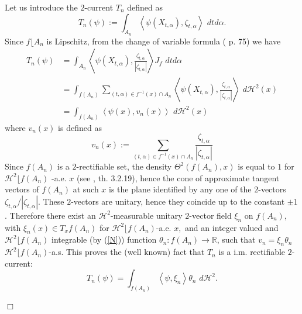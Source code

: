 \documentclass{article}
\newenvironment{proof}[1][Proof]{{\sc #1.} }{\hfill $\Box$}
\begin{document}
\begin{proof}

Let us introduce the $2$-current $T_{n}$ defined as
\begin{equation*}
T_{n}\left( \psi \right) :=\int_{A_{n}}\left\langle \psi \left( X_{t,\alpha
}\right) ,\zeta_{t,\alpha}\right\rangle \,\,dtd\alpha .
\end{equation*}
Since $f\lfloor A_{n}$ is Lipschitz, from the change of variable formula ( 
\cite{GMS} p. 75) we have 
\begin{equation*}
  \begin{split}
T_{n}\left( \psi \right) & =\int_{A_{n}}\left\langle \psi \left( X_{t,\alpha
}\right) ,\frac{\zeta_{t,\alpha}}{|\zeta_{t,\alpha}|}%
\right\rangle J_{f}\,\,dtd\alpha 
\\ &= \int_{f\left( A_{n}\right) }\sum_{\left( t,\alpha \right) \in
f^{-1}\left( x\right) \cap A_{n}}\left\langle \psi \left( X_{t,\alpha
}\right) ,\frac{\zeta_{t,\alpha}}{|\zeta_{t,\alpha}|}
\right\rangle \,\,d\mathcal{H}^{2}\left( x\right)  
\\&=\int_{f\left( A_{n}\right) }\left\langle \psi \left( x\right)
,v_{n}\left( x\right) \right\rangle \,\,d\mathcal{H}^{2}\left( x\right) 
  \end{split}
\end{equation*}
where $v_{n}\left( x\right) $ is defined as
\begin{equation*}
v_{n}\left( x\right) :=\sum_{\left( t,\alpha \right) \in f^{-1}\left(
x\right) \cap A_{n}}\frac{\zeta_{t,\alpha}}{|\zeta_{t,\alpha}|}
\end{equation*}
Since $f(A_{n})$ is a $2$-rectifiable set, the density $\Theta ^{2}\left(
f(A_{n}),x\right) $ is equal to $1$ for $\mathcal{H}^{2}\lfloor f(A_{n})$%
-a.e. $x$ (see \cite{Fed}, th. 3.2.19), hence the cone of approximate
tangent vectors of $f(A_{n})$ at such $x$ is the plane identified by any one
of the $2$-vectors $\zeta_{t,\alpha}/|\zeta_{t,\alpha}|$. These $2$-vectors are unitary, hence they
coincide up to the constant $\pm 1$. Therefore there exist an $\mathcal{H}%
^{2}$-measurable unitary $2$-vector field $\xi _{n}$ on $f(A_{n})$, with $%
\xi _{n}\left( x\right) \in T_{x}f(A_{n})$ for $\mathcal{H}^{2}\lfloor
f(A_{n})$-a.e. $x,$ and an integer valued and $\mathcal{H}^{2}\lfloor
f(A_{n})$ integrable (by (\ref{N})) function $\theta
_{n}:f(A_{n})\rightarrow \mathbb{R}$, such that $v_{n}=\xi _{n}\theta _{n}$ $%
\mathcal{H}^{2}\lfloor f(A_{n})$-a.s. This proves the (well known) fact that 
$T_{n}$ is a i.m. rectifiable $2$-current:
\begin{equation}
T_{n}\left( \psi \right) =\int_{f\left( A_{n}\right) }\left\langle \psi ,\xi
_{n}\right\rangle \theta _{n}\,\,d\mathcal{H}^{2}.  \label{Tn}
\end{equation}


\end{proof}
\end{document}
